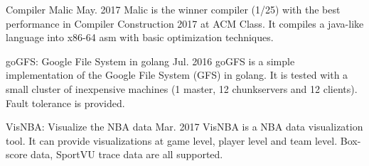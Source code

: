 

\begin{cventries}


  \cventry
    {} %
    {Compiler Malic} %
    {May. 2017} %
    {} %
    {
      Malic is the winner compiler (1/25) with the best performance in Compiler Construction 2017 at ACM Class. \quad \quad It compiles a java-like language into x86-64 asm with basic optimization techniques.
    }

  \cventry
    {} %
    {goGFS: Google File System in golang} %
    {Jul. 2016} %
    {} %
    {
        goGFS is a simple implementation of the Google File System (GFS) in golang.
        It is tested with a small cluster of inexpensive machines (1 master, 12 chunkservers and 12 clients).
        Fault tolerance is provided.
    }

  \cventry
    {} %
    {VisNBA: Visualize the NBA data} %
    {Mar. 2017} %
    {} %
    {
        VisNBA is a NBA data visualization tool. It can provide visualizations at game level, player level and team level. Box-score data, SportVU trace data are all supported.
    }


\end{cventries}
